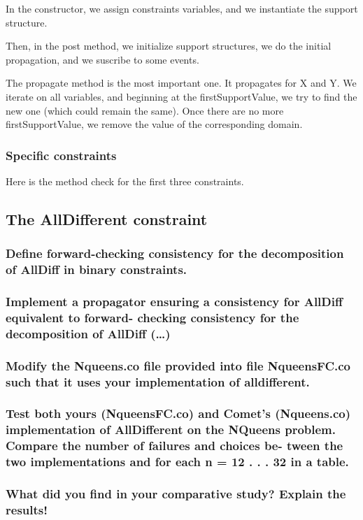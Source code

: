\documentclass[a4paper ,12pt,french]{article}
\begin{document}
In the constructor, we assign constraints variables, and we instantiate the support structure.


Then, in the post method, we initialize support structures, we do the initial propagation, and we suscribe to some events.


The propagate method is the most important one. It propagates for X and Y. We iterate on all variables, and beginning at the firstSupportValue, we try to find the new one (which could remain the same). Once there are no more firstSupportValue, we remove the value of the corresponding domain.


\subsubsection{Specific constraints}
Here is the method check for the first three constraints.


\subsection{The AllDifferent constraint}
\subsubsection{Define forward-checking consistency for the decomposition of AllDiff in binary constraints.}
\subsubsection{Implement a propagator ensuring a consistency for AllDiff equivalent to forward- checking consistency for the decomposition of AllDiff (\dots)}


\subsubsection{Modify the Nqueens.co file provided into file NqueensFC.co such that it uses your implementation of alldifferent.}
\subsubsection{Test both yours (NqueensFC.co) and Comet’s (Nqueens.co) implementation of AllDifferent on the NQueens problem. Compare the number of failures and choices be- tween the two implementations and for each n = 12 . . . 32 in a table.}
\subsubsection{What did you find in your comparative study? Explain the results!}
\end{document}
